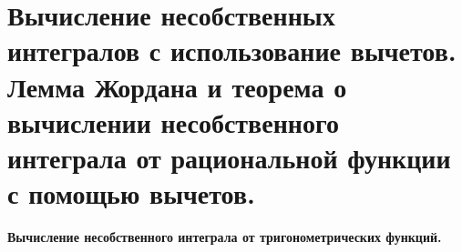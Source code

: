 \newpage 
\section{Вычисление несобственных интегралов с использование вычетов. Лемма Жордана и теорема о вычислении несобственного интеграла от рациональной функции с помощью вычетов.}

\textbf{Вычисление несобственного интеграла от тригонометрических функций.}